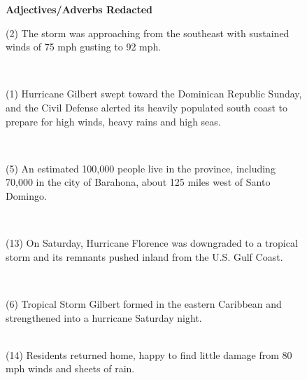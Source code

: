 \begin{figure}[p]
{\begin{minipage}{\textwidth}
\textbf{Adjectives/Adverbs Redacted}\\
\colorbox{Dandelion!25!}{\begin{minipage}{\textwidth}(2) The storm was approaching from the southeast with sustained winds of 75 mph gusting to 92 mph.\end{minipage}}\\
\colorbox{Orchid!25!}{\begin{minipage}{\textwidth}(1) Hurricane Gilbert swept toward the Dominican Republic Sunday, and the Civil Defense alerted its heavily populated south coast to prepare for high winds, heavy rains and high seas.\end{minipage}}\\
\colorbox{GreenYellow!35!}{\begin{minipage}{\textwidth}(5) An estimated 100,000 people live in the province, including 70,000 in the city of Barahona, about 125 miles west of Santo Domingo.\end{minipage}}\\
\colorbox{green!25!}{\begin{minipage}{\textwidth}(13) On Saturday, Hurricane Florence was downgraded to a tropical storm and its remnants pushed inland from the U.S. Gulf Coast.\end{minipage}}\\
\colorbox{ProcessBlue!15!}{\begin{minipage}{\textwidth}(6) Tropical Storm Gilbert formed in the eastern Caribbean and strengthened into a hurricane Saturday night.\end{minipage}}\\
(14) Residents returned home, happy to find little damage from 80 mph winds and sheets of rain.\\


\end{minipage}}
\end{figure}
